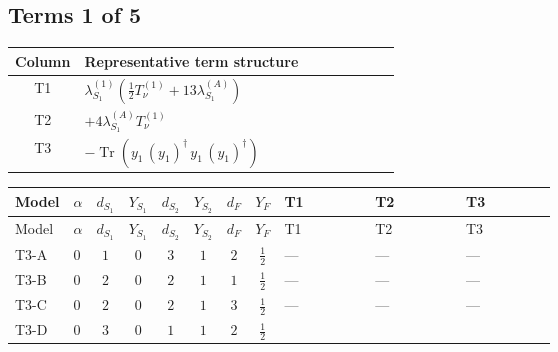 \documentclass[8pt]{article}
\begin{document}
\begin{landscape}
\subsection*{Terms 1 of 5}
\begin{center}
\begin{tabular}{@{}c >{\raggedright\arraybackslash}p{0.82\linewidth}@{}}
\toprule
Column & Representative term structure \\
\midrule
T1 & \(\displaystyle {\lambda_{S_1}^{(1)}} \left(\frac{1}{2} T_{\nu}^{(1)}+13 {\lambda_{S_1}^{(A)}}\right)\) \\
\midrule
T2 & \(\displaystyle +4 {\lambda_{S_1}^{(A)}} T_{\nu}^{(1)}\) \\
\midrule
T3 & \(\displaystyle -\operatorname{Tr}\!\left({y_1}\,\left({y_1}\right)^{\dagger}\,{y_1}\,\left({y_1}\right)^{\dagger}\right)\) \\
\midrule
\bottomrule
\end{tabular}
\end{center}
\smallskip
\tiny
\begin{longtable}{@{}llcccccc >{\raggedright\arraybackslash}p{0.21\linewidth} >{\raggedright\arraybackslash}p{0.21\linewidth} >{\raggedright\arraybackslash}p{0.21\linewidth}@{}}
\toprule
Model & $\alpha$ & $d_{S_1}$ & $Y_{S_1}$ & $d_{S_2}$ & $Y_{S_2}$ & $d_F$ & $Y_F$ & T1 & T2 & T3 \\
\midrule
\endfirsthead
\toprule
Model & $\alpha$ & $d_{S_1}$ & $Y_{S_1}$ & $d_{S_2}$ & $Y_{S_2}$ & $d_F$ & $Y_F$ & T1 & T2 & T3 \\
\midrule
\endhead
T3-A & $0$ & $1$ & $0$ & $3$ & $1$ & $2$ & $\frac{1}{2}$ & --- & --- & --- \\
\midrule
T3-B & $0$ & $2$ & $0$ & $2$ & $1$ & $1$ & $\frac{1}{2}$ & --- & --- & --- \\
\midrule
T3-C & $0$ & $2$ & $0$ & $2$ & $1$ & $3$ & $\frac{1}{2}$ & --- & --- & --- \\
\midrule
T3-D & $0$ & $3$ & $0$ & $1$ & $1$ & $2$ & $\frac{1}{2}$ & \scriptsize\adjustbox{max width=\linewidth}{$\begin{gathered} {\lambda_{S_1}^{(1)}} \left(\frac{1}{2} T_{\nu}^{(1)}+13 {\lambda_{S_1}^{(A)}}\right)\end{gathered}$} & \scriptsize\adjustbox{max width=\linewidth}{$\begin{gathered} +4 {\lambda_{S_1}^{(A)}} T_{\nu}^{(1)}\end{gathered}$} & \scriptsize\adjustbox{max width=\linewidth}{$\begin{gathered} -\operatorname{Tr}\!\left({y_1}\,\left({y_1}\right)^{\dagger}\,{y_1}\,\left({y_1}\right)^{\dagger}\right)\end{gathered}$} \\

\end{longtable}
\end{landscape}
\end{document}
